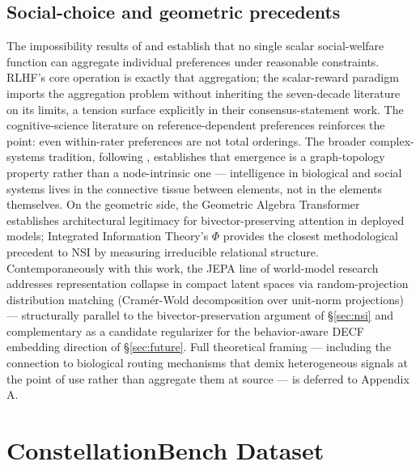 \documentclass{article}
\begin{document}
\subsection{Social-choice and geometric precedents}
The impossibility results of \citet{arrow1950difficulty} and \citet{sen1970collective} establish that no single scalar social-welfare function can aggregate individual preferences under reasonable constraints. RLHF's core operation is exactly that aggregation; the scalar-reward paradigm imports the aggregation problem without inheriting the seven-decade literature on its limits, a tension \citet{bakker2022finetuning} surface explicitly in their consensus-statement work. The cognitive-science literature on reference-dependent preferences \citep{kahneman1979prospect} reinforces the point: even within-rater preferences are not total orderings. The broader complex-systems tradition, following \citet{kauffman1993origins}, establishes that emergence is a graph-topology property rather than a node-intrinsic one --- intelligence in biological and social systems lives in the connective tissue between elements, not in the elements themselves. On the geometric side, the Geometric Algebra Transformer \citep{brehmer2023geometric} establishes architectural legitimacy for bivector-preserving attention in deployed models; Integrated Information Theory's $\Phi$ \citep{oizumi2014phenomenology} provides the closest methodological precedent to NSI by measuring irreducible relational structure. Contemporaneously with this work, the JEPA line of world-model research \citep{balestriero2025lejepa, maes2026leworldmodel} addresses representation collapse in compact latent spaces via random-projection distribution matching (Cram{\'e}r-Wold decomposition over unit-norm projections) --- structurally parallel to the bivector-preservation argument of \S\ref{sec:nsi} and complementary as a candidate regularizer for the behavior-aware DECF embedding direction of \S\ref{sec:future}. Full theoretical framing --- including the connection to biological routing mechanisms that demix heterogeneous signals at the point of use rather than aggregate them at source --- is deferred to Appendix A.

\section{ConstellationBench Dataset}
\label{sec:dataset}
\end{document}
